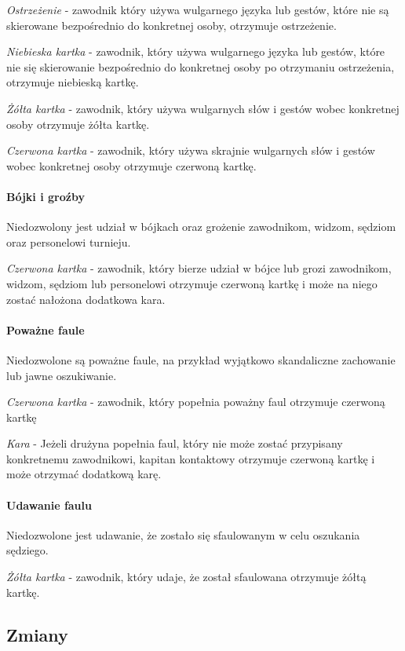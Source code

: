 \documentclass[12pt]{article}
\begin{document}
\emph{Ostrzeżenie} - zawodnik który używa wulgarnego języka lub gestów,
które nie są skierowane bezpośrednio do konkretnej osoby, otrzymuje
ostrzeżenie.

\emph{Niebieska kartka} - zawodnik, który używa wulgarnego języka lub
gestów, które nie się skierowanie bezpośrednio do konkretnej osoby po
otrzymaniu ostrzeżenia, otrzymuje niebieską kartkę.

\emph{Żółta kartka} - zawodnik, który używa wulgarnych słów i gestów
wobec konkretnej osoby otrzymuje żółta kartkę.

\emph{Czerwona kartka} - zawodnik, który używa skrajnie wulgarnych słów
i gestów wobec konkretnej osoby otrzymuje czerwoną kartkę.

\paragraph{Bójki i groźby}
Niedozwolony jest udział w bójkach
oraz grożenie zawodnikom, widzom, sędziom oraz personelowi turnieju.

\emph{Czerwona kartka} - zawodnik, który bierze udział w bójce lub grozi
zawodnikom, widzom, sędziom lub personelowi otrzymuje czerwoną kartkę i
może na niego zostać nałożona dodatkowa kara.

\paragraph{Poważne faule}
Niedozwolone są poważne faule, na
przykład wyjątkowo skandaliczne zachowanie lub jawne oszukiwanie.

\emph{Czerwona kartka} - zawodnik, który popełnia poważny faul otrzymuje
czerwoną kartkę

\emph{Kara} - Jeżeli drużyna popełnia faul, który nie może zostać
przypisany konkretnemu zawodnikowi, kapitan kontaktowy otrzymuje
czerwoną kartkę i może otrzymać dodatkową karę.

\paragraph{Udawanie faulu}
Niedozwolone jest udawanie, że
zostało się sfaulowanym w celu oszukania sędziego.

\emph{Żółta kartka} - zawodnik, który udaje, że został sfaulowana
otrzymuje żółtą kartkę.

\subsection{Zmiany}
\end{document}
